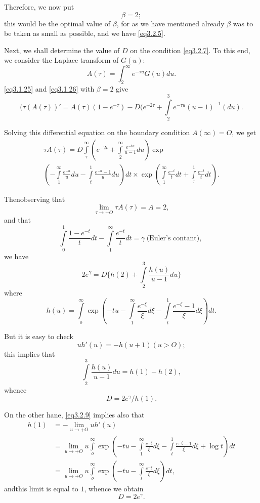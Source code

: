 Therefore, we now put 
\begin{equation*}
\beta = 2; \tag{3.2.7}\label{eq3.2.7}
\end{equation*}
this would be the optimal value of $\beta$, for as we have mentioned
already $\beta$ was to be taken as small as possible, and we have
\eqref{eq3.2.5}. 

Next, we shall determine the value of $D$ on the condition \eqref{eq3.2.7}. To
this end, we consider the Laplace transform of $G(u)$: 
$$
A(\tau)= \int^\infty_2 e^{-\tau u} G(u)du.
$$
\eqref{eq3.1.25} and \eqref{eq3.1.26} with  $\beta = 2$ give
$$
(\tau(A(\tau))'=A(\tau)(1-e^{-\tau})- D(e^{-2 \tau}+\int\limits^3_2
e^{-\tau u}(u-1)^{-1}(du). 
$$

Solving this differential equation on the boundary condition
$A(\infty)=O$, we get 
\begin{multline*}
  \tau A(\tau)=D \int\limits^\infty_\tau \left(e^{-2t}+\int\limits^\infty_2
  \frac{e^{-tu}}{u-1}du\right)\exp \\
  \left(-\int\limits^\infty_1 \frac{e^{-u}}{u}du
 -\int\limits^1_t \frac{e^{-u}-1}{u}du\right)dt
 \times \exp\left(\int\limits^\infty_1 \frac{e^{-t}}{t}dt +
 \int\limits^1_\tau \frac{e^{-t}}{t}dt\right). 
\end{multline*}
 
 Then\pageoriginale observing that
 \begin{equation*}
   \lim_{\tau \to + O}\tau A(\tau)=A=2, \tag{3.2.8}\label{eq3.2.8}
 \end{equation*} 
 and that
 $$
 \int\limits^1_0 \frac{1-e^{-t}}{t}dt-\int\limits^\infty_1
 \frac{e^{-t}}{t}dt =\gamma ~\text{(Euler's contant)},~ 
 $$
 we have
 $$
  2e^\gamma = D\{h(2)+\int\limits^3_2 \frac{h(u)}{u-1}du \}
 $$
 where
 $$
 h(u)=\int\limits^\infty_o\exp \left(-tu-\int\limits^\infty_1
 \frac{e^{-\xi}}{\xi}d \xi -\int\limits^1_t \frac{e^{-\xi}-1}{\xi}d
 \xi\right)dt. 
 $$
 
 But it is easy to check
 \begin{equation*}
   uh'(u)= -h(u+1) (u > O); \tag{3.2.9}\label{eq3.2.9}
 \end{equation*} 
 this implies that
 $$
 \int\limits
 ^3_2 \frac{h(u)}{u -1}du = h(1)-h(2),
 $$
 whence
 $$ 
 D=2 e^\gamma/h(1).
 $$
 
 On the other hane, \eqref{eq3.2.9} implies also that
 \begin{align*}
   h(1) & = - \lim_{u \to +O}uh'(u)\\
   &=  \lim_{u \to +O}u \int\limits^\infty_o\exp\left(-tu -
   \int\limits^\infty_1 \frac{e^{- \xi}}{\xi}d \xi -\int\limits^1_t
   \frac{e^{-\xi}-1}{\xi}d \xi + \log t\right) dt \\ 
   &=  \lim_{u \to +O}u \int\limits^\infty_o\exp \left(-tu -
   \int\limits^\infty_t \frac{e^{- \xi}}{\xi}d \xi \right)dt, 
\end{align*} 
and\pageoriginale this limit is equal to $1$, whence we obtain
$$
D = 2e^\gamma.
$$

